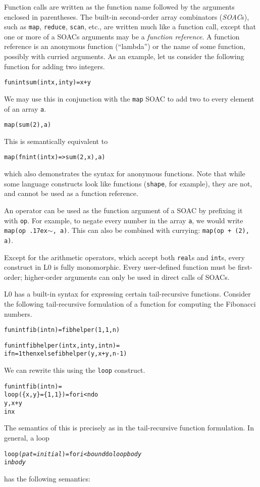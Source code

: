 \documentclass[oneside]{memoir}
\newcommand\realt[0]{\texttt{real}}
\newcommand\intt[0]{\texttt{int}}
\renewcommand\tilde[0]{{\raise.17ex\hbox{$\scriptstyle\sim$}}}
\begin{document}
Function calls are written as the function name followed by the
arguments enclosed in parentheses.  The built-in second-order array
combinators (\emph{SOAC}s), such as \texttt{map}, \texttt{reduce}, \texttt{scan}, etc., 
are written much like a function call,
except that one or more of a SOACs arguments may be a \emph{function
  reference}.  A function reference is an anonymous function
(``lambda'') or the name of some function, possibly with curried
arguments.  As an example, let us consider the following function for
adding two integers.
\begin{alltt}
fun int sum(int x, int y) = x + y
\end{alltt}
We may use this in conjunction with the \texttt{map} SOAC to add two
to every element of an array \texttt{a}.
\begin{alltt}
map(sum (2), a)
\end{alltt}
This is semantically equivalent to
\begin{alltt}
map(fn int (int x) => sum(2, x), a)
\end{alltt}
which also demonstrates the syntax for anonymous functions.  Note that
while some language constructs look like functions (\texttt{shape}, for
example), they are not, and cannot be used as a function reference.

An operator can be used as the function argument of a SOAC by
prefixing it with \texttt{op}.  For example, to negate every number in
the array \texttt{a}, we would write \texttt{map(op \tilde{}, a)}.
This can also be combined with currying: \texttt{map(op + (2), a)}.

Except for the arithmetic operators, which accept both \realt{}s
and \intt{}s, every construct in L0 is fully monomorphic.  Every
user-defined function must be first-order; higher-order arguments can
only be used in direct calls of SOACs.

L0 has a built-in syntax for expressing certain tail-recursive
functions.  Consider the following tail-recursive formulation of a
function for computing the Fibonacci numbers.
\begin{alltt}
  fun int fib(int n) = fibhelper(1,1,n)

  fun int fibhelper(int x, int y, int n) =
    if n = 1 then x else fibhelper(y, x+y, n-1)
\end{alltt}
We can rewrite this using the \texttt{loop} construct.
\begin{alltt}
  fun int fib(int n) =
    loop (\{x, y\} = \{1,1\}) = for i < n do
                              {y, x+y}
    in x
\end{alltt}
The semantics of this is precisely as in the tail-recursive function
formulation.  In general, a loop
\begin{alltt}
  loop (\emph{pat} = \emph{initial}) = for \emph{i} < \emph{bound} do \emph{loopbody}
  in \emph{body}
\end{alltt}
has the following semantics:
\end{document}
